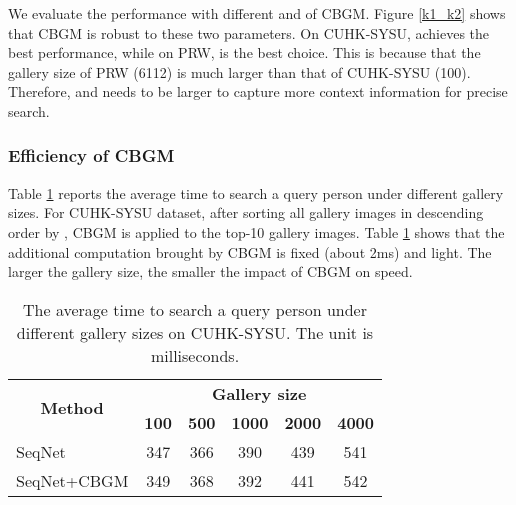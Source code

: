 \documentclass[letterpaper]{article} \usepackage{aaai21}  \usepackage{times}  \usepackage{helvet} \usepackage{courier}  \usepackage[hyphens]{url}  \usepackage{graphicx} \urlstyle{rm} \def\UrlFont{\rm}  \usepackage{natbib}  \usepackage{caption} \usepackage{multirow}
\begin{document}
We evaluate the performance with different  and  of CBGM. Figure \ref{k1_k2} shows that CBGM is robust to these two parameters. On CUHK-SYSU,  achieves the best performance, while on PRW,  is the best choice. This is because that the gallery size of PRW (6112) is much larger than that of CUHK-SYSU (100). Therefore,  and  needs to be larger to capture more context information for precise search.

\subsubsection{Efficiency of CBGM}
Table \ref{cbgm_speed} reports the average time to search a query person under different gallery sizes. For CUHK-SYSU dataset, after sorting all gallery images in descending order by , CBGM is applied to the top-10 gallery images. Table \ref{cbgm_speed} shows that the additional computation brought by CBGM is fixed (about 2ms) and light. The larger the gallery size, the smaller the impact of CBGM on speed.

\begin{table}[t]
    \centering
\resizebox{0.8\columnwidth}{!}
    {
        \begin{tabular}{|l|ccccc|}
            \hline
            \multicolumn{1}{|c|}{\multirow{2}{*}{\textbf{Method}}} & \multicolumn{5}{c|}{\textbf{Gallery size}}                                       \\ \cline{2-6} 
            \multicolumn{1}{|l|}{}                                 & \textbf{100}  & \textbf{500}  & \textbf{1000}   & \textbf{2000}  & \textbf{4000} \\ \hline \hline
            SeqNet                                                 & 347           & 366           & 390             & 439            & 541           \\
            SeqNet+CBGM                                            & 349           & 368           & 392             & 441            & 542           \\ \hline
        \end{tabular}
    }
    \caption{The average time to search a query person under different gallery sizes on CUHK-SYSU. The unit is milliseconds.}
    \label{cbgm_speed}
\end{table}
\end{document}
